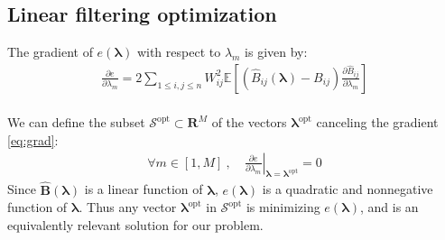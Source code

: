 \documentclass[12pt]{scrartcl}
\begin{document}
\subsection{Linear filtering optimization}
The gradient of $e\left(\boldsymbol{\lambda}\right)$ with respect to $\lambda_m$ is given by:
\begin{align}
\label{eq:grad}
\frac{\partial e}{\partial \lambda_m} = 2 \sum_{1 \le i,j \le n} W_{ij}^2 \mathbb{E}\left[ \left(\widehat{B}_{ij}\left(\boldsymbol{\lambda}\right) - B_{ij} \right) \frac{\partial \widehat{B}_{ij}}{\partial \lambda_m} \right]
\end{align}
$  $\\
We can define the subset $\mathcal{S}^\mathrm{opt} \subset \mathbf{R}^M$ of the vectors $\boldsymbol{\lambda}^\mathrm{opt}$ canceling the gradient \eqref{eq:grad}:
\begin{align}
\label{eq:grad_zero}
\forall m \in [1,M] \ , \ & \left.\frac{\partial e}{\partial \lambda_m}\right|_{\boldsymbol{\lambda}=\boldsymbol{\lambda}^\mathrm{opt}} = 0
\end{align}
Since $\widehat{\mathbf{B}}\left(\boldsymbol{\lambda}\right)$ is a linear function of $\boldsymbol{\lambda}$, $e\left(\boldsymbol{\lambda}\right)$ is a quadratic and nonnegative function of $\boldsymbol{\lambda}$. Thus any vector $\boldsymbol{\lambda}^\mathrm{opt}$ in $\mathcal{S}^\mathrm{opt}$ is minimizing $e\left(\boldsymbol{\lambda}\right)$, and is an equivalently relevant solution for our problem.
\end{document}
